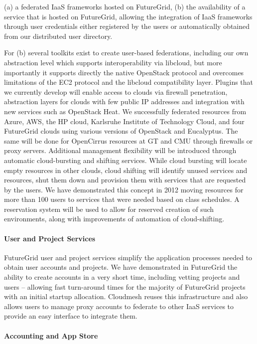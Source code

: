 \documentclass{tex/sig-alternate}
\begin{document}
(a) a federated IaaS frameworks hosted on FutureGrid,
(b) the availability of a service that is hosted on FutureGrid, allowing the integration of IaaS frameworks through user credentials either registered by the users or automatically obtained from our distributed user directory.


For (b) several toolkits exist to create user-based federations, including our own abstraction level which supports interoperability via libcloud, but more importantly it supports directly the native OpenStack protocol and overcomes limitations of the EC2 protocol and the libcloud compatibility layer. Plugins that we currently develop will enable access to clouds via firewall penetration, abstraction layers for clouds with few public IP addresses and integration with new services such as OpenStack Heat. We successfully federated resources from Azure, AWS, the HP cloud, Karlsruhe Institute of Technology Cloud, and four FutureGrid clouds using various versions of OpenStack and Eucalyptus. The same will be done for OpenCirrus resources at GT and CMU through firewalls or proxy servers.
Additional management flexibility will be introduced through automatic cloud-bursting and shifting services. While cloud bursting will locate empty resources in other clouds, cloud shifting will identify unused services and resources, shut them down and provision them with services that are requested by the users. We have demonstrated this concept in 2012 moving resources for more than 100 users to services that were needed based on class schedules. A reservation system will be used to allow for reserved creation of such environments, along with improvements of automation of cloud-shifting.


\paragraph{User and Project Services}


FutureGrid user and project services simplify the application processes needed to obtain user accounts and projects. We have demonstrated in FutureGrid the ability to create accounts in a very short time, including vetting projects and users -- allowing fast turn-around times for the majority of FutureGrid projects with an initial startup allocation. Cloudmesh reuses this infrastructure and also allows users to manage proxy accounts to federate to other IaaS services to provide an easy interface to integrate them.


\paragraph{Accounting and App Store}
\end{document}
